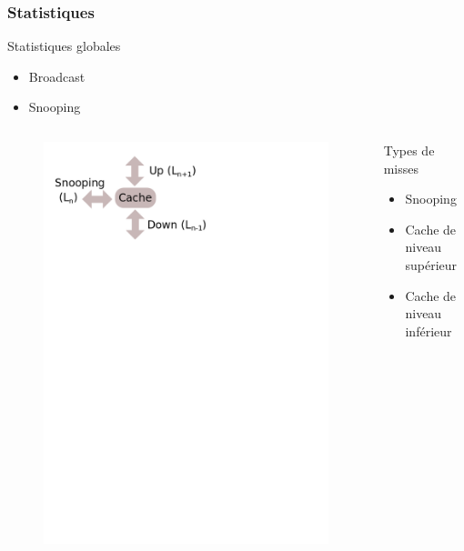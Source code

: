 \begin{frame}[fragile]
  \frametitle{Statistiques}
  
  \begin{block}{Statistiques globales}
    \begin{itemize}
    \item{Broadcast}
    \item{Snooping}
    \end{itemize}
  \end{block}
  
  \begin{columns}[T]
    \begin{column}{.5\textwidth}
      \begin{figure}[h!]
	\includegraphics[scale=.4]{images/misses.png}
      \end{figure}
    \end{column}
    \begin{column}{.5\textwidth}
      \bigskip
      \begin{block}{Types de misses}
	\begin{itemize}
	\item{Snooping}
        \item{Cache de niveau supérieur}
        \item{Cache de niveau inférieur}
	\end{itemize}
      \end{block}
    \end{column}
  \end{columns}
\end{frame}
